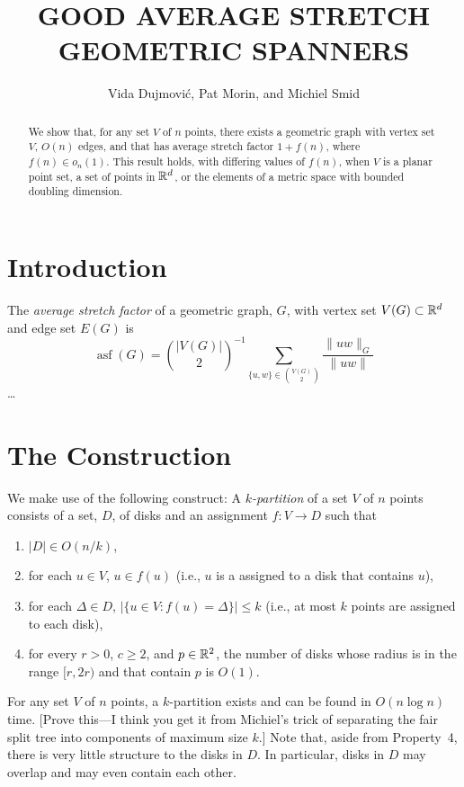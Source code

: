 \documentclass{patmorin}
\title{\MakeUppercase{Good Average Stretch Geometric Spanners}}
\author{Vida Dujmovi\'c, Pat Morin, and Michiel Smid}
\DeclareMathOperator{\asf}{asf}
\begin{document}
\begin{titlepage}
\maketitle

\begin{abstract}
  We show that, for any set $V$ of $n$ points, there exists a geometric
  graph with vertex set $V$, $O(n)$ edges, and that has average stretch
  factor $1+f(n)$, where $f(n)\in o_n(1)$.  This result holds, with
  differing values of $f(n)$, when $V$ is a planar point set, a set
  of points in $\mathbb{R}^d$, or the elements of a metric space with bounded
  doubling dimension.
\end{abstract}

\end{titlepage}

\section{Introduction}

The \emph{average stretch factor} of a geometric graph, $G$, with vertex
set $V(G)\subset \mathbb{R}^d$ and edge set $E(G)$ is
\[
    \asf(G) = \binom{|V(G)|}{2}^{-1}\sum_{\{u,w\}\in\binom{V(G)}{2}}\frac{\|uw\|_G}{\|uw\|}
\]
\ldots

\section{The Construction}

We make use of the following construct:  A \emph{$k$-partition} of a
set $V$ of $n$ points consists of a set, $D$,
of disks and an assignment $f:V\to D$ such that
\begin{enumerate}
  \item $|D|\in O(n/k)$,
  \item for each $u\in V$, $u\in f(u)$ (i.e., $u$ is a assigned to a
    disk that contains $u$),
  \item for each $\Delta\in D$, $|\{u\in V: f(u)=\Delta\}|\le k$ (i.e.,
   at most $k$ points are assigned to each disk),
  \item for every $r> 0$, $c\ge 2$, and $p\in\mathbb{R}^2$, the number of disks
   whose radius is in the range $[r,2r)$ and that contain $p$ is $O(1)$.
\end{enumerate}
For any set $V$ of $n$ points, a $k$-partition exists and can be found in
$O(n\log n)$ time. [Prove this---I think you get it from Michiel's trick
of separating the fair split tree into components of maximum size $k$.]
Note that, aside from Property~4, there is very little structure to
the disks in $D$. In particular, disks in $D$ may overlap and may
even contain each other.
\end{document}
